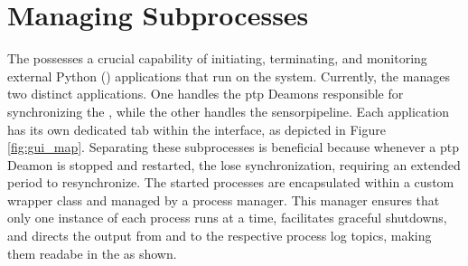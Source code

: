 \section{Managing Subprocesses}

The \srgui possesses a crucial capability of initiating, terminating, and monitoring external Python (\py) applications that run on the \jx system.
Currently, the \srgui manages two distinct \py applications.
One handles the \gls{ptp} Deamons responsible for synchronizing the \cams, while the other handles the \gls{sensorpipeline}.
Each application has its own dedicated tab within the \srgui interface, as depicted in Figure \ref{fig:gui_map}.
Separating these subprocesses is beneficial because whenever a \gls{ptp} Deamon is stopped and restarted, the \cams lose synchronization, requiring an extended period to resynchronize.
The started processes are encapsulated within a custom wrapper class and managed by a process manager.
This manager ensures that only one instance of each process runs at a time, facilitates graceful shutdowns, and directs the output from  and  to the respective process log topics, making them readabe in the \srgui as shown.

